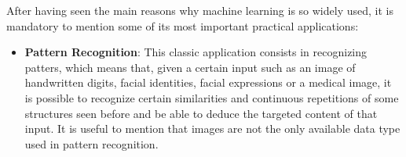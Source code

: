 After having seen the main reasons why machine learning is so widely used, it is mandatory to mention some of its most important practical applications:

\begin{itemize}
    \item \textbf{Pattern Recognition}: This classic application consists in recognizing patters, which means that, given a certain input such as an image of handwritten digits, facial identities, facial expressions or a medical image, it is possible to recognize certain similarities and continuous repetitions of some structures seen before and be able to deduce the targeted content of that input. It is useful to mention that images are not the only available data type used in pattern recognition.
          \vspace{5mm}


\end{itemize}
